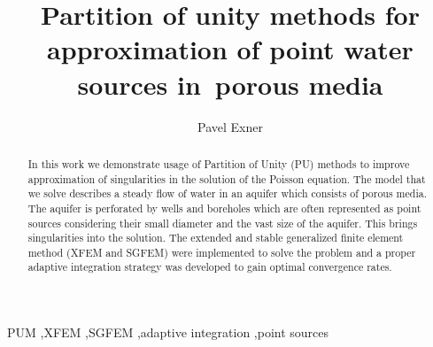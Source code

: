 \documentclass[preprint,12pt,authoryear]{elsarticle}
\begin{document}
\begin{frontmatter}



\title{Partition of unity methods for approximation of point water sources in~porous media}


\author{Pavel Exner}
\address{Technical University of Liberec, Studentsk{\' a} 1402/2, 461 17 Liberec 1, Czech Republic}

\begin{abstract}
In this work we demonstrate usage of Partition of Unity (PU) methods to improve approximation of singularities 
in the solution of the Poisson equation. The model that we solve describes a steady flow of water in an aquifer
which consists of porous media. The aquifer is perforated by wells and boreholes which are often represented
as point sources considering their small diameter and the vast size of the aquifer. This brings singularities 
into the solution. The extended and stable generalized finite element method (XFEM and SGFEM) were implemented 
to solve the problem and a proper adaptive integration strategy was developed to gain optimal convergence rates.
\end{abstract}

\begin{keyword}
PUM \sep XFEM \sep SGFEM \sep adaptive integration \sep point sources



\end{keyword}

\end{frontmatter}
\end{document}
